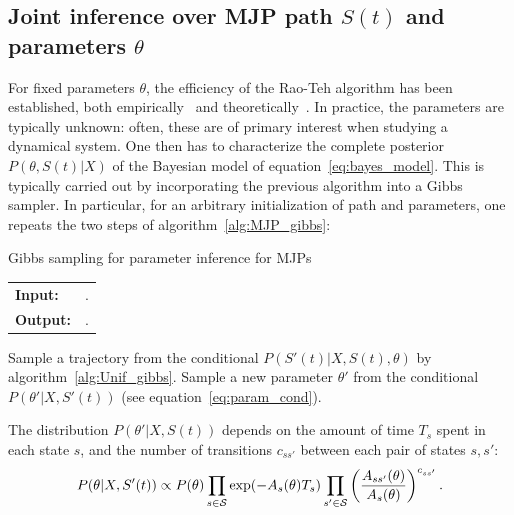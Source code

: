 \subsection{Joint inference over MJP path $S(t)$ and parameters $\theta$}
For fixed parameters $\theta$, the efficiency of the Rao-Teh algorithm has been established, both empirically~\citep{RaoTeh13} and theoretically~\citep{miasojedow2017}.
In practice, the parameters are typically unknown: often, these are of primary interest when studying a dynamical system. 
One then has to characterize the complete posterior $P(\theta, S(t)|X)$ of the Bayesian model of equation~\eqref{eq:bayes_model}. 
This is typically carried out by incorporating the previous algorithm into a Gibbs sampler. 
In particular, for an arbitrary initialization of path and  parameters, one repeats the two steps of algorithm~\ref{alg:MJP_gibbs}:
\begin{algorithm}[H]
  \caption{Gibbs sampling for parameter inference for MJPs}
   \label{alg:MJP_gibbs}
  \begin{tabular}{l l}
   \textbf{Input:  } %
                      & \text{The previous MJP path $S(t) = (S, T)$, the previous MJP parameters $\theta$}.\\ 
   \textbf{Output:  }& \text{New MJP trajectory $S' (t) = (S', T')$ and 
                            parameters $\theta'$}.\\
   \hline
   \end{tabular}
   \begin{algorithmic}[1]
  \State  Sample a trajectory from the conditional 
  $P(S'(t)|X,S(t),\theta)$ by 
  algorithm~\ref{alg:Unif_gibbs}.
  \State Sample a new parameter $\theta'$ from the conditional 
  $P(\theta'|X,S'(t))$ (see equation~\eqref{eq:param_cond}).
   \end{algorithmic}
\end{algorithm} 
The distribution $P(\theta'|X,S(t))$ depends on %
the amount of time $T_s$ spent in each state $s$, and the number of transitions $c_{ss'}$ between each pair of states $s,s'$: 
\begin{align}
  \label{eq:param_cond}
  P(\theta|X,S'(t)) \propto P(\theta) \prod_{s \in {\mathcal S}} \exp(-A_s(\theta)T_s) 
  \prod_{s' \in {\mathcal S}} \left(\frac{A_{ss'}(\theta)}{A_s(\theta)}\right)^{c_{ss'}}.
\end{align}
